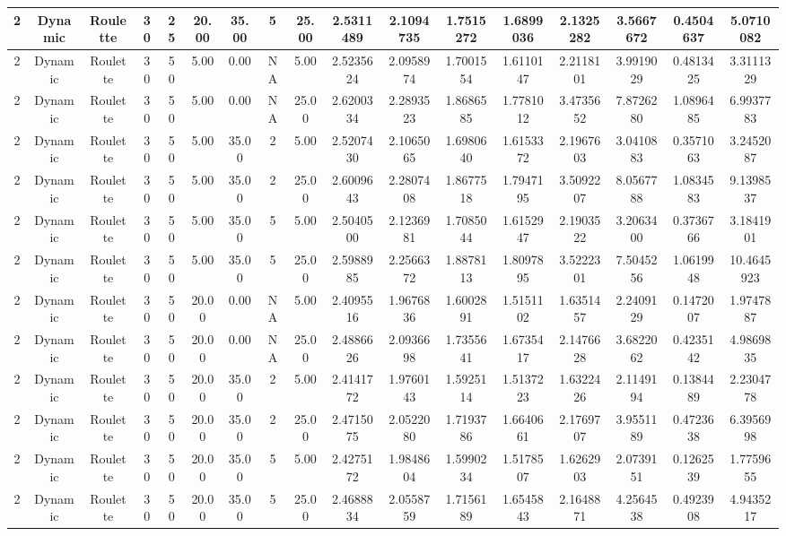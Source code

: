\documentclass[a4paper]{article}
\begin{document}
\begin{center}
\begin{tabular}{ | c | c | c | c | c | c | c | c | c | c | c | c | c | c | c | c | c | }
		\hline
		2	&	Dynamic	&	Roulette	&	30	&	25	&	20.00	&	35.00	&	5	&	25.00	&	2.5311489	&	2.1094735	&	1.7515272	&	1.6899036	&	2.1325282	&	3.5667672	&	0.4504637	&	5.0710082 \\
		\hline
		2	&	Dynamic	&	Roulette	&	30	&	50	&	5.00	&	0.00	&	NA	&	5.00	&	2.5235624	&	2.0958974	&	1.7001554	&	1.6110147	&	2.2118101	&	3.9919029	&	0.4813425	&	3.3111329 \\
		\hline
		2	&	Dynamic	&	Roulette	&	30	&	50	&	5.00	&	0.00	&	NA	&	25.00	&	2.6200334	&	2.2893523	&	1.8686585	&	1.7781012	&	3.4735652	&	7.8726280	&	1.0896485	&	6.9937783 \\
		\hline
		2	&	Dynamic	&	Roulette	&	30	&	50	&	5.00	&	35.00	&	2	&	5.00	&	2.5207430	&	2.1065065	&	1.6980640	&	1.6153372	&	2.1967603	&	3.0410883	&	0.3571063	&	3.2452087 \\
		\hline
		2	&	Dynamic	&	Roulette	&	30	&	50	&	5.00	&	35.00	&	2	&	25.00	&	2.6009643	&	2.2807408	&	1.8677518	&	1.7947195	&	3.5092207	&	8.0567788	&	1.0834583	&	9.1398537 \\
		\hline
		2	&	Dynamic	&	Roulette	&	30	&	50	&	5.00	&	35.00	&	5	&	5.00	&	2.5040500	&	2.1236981	&	1.7085044	&	1.6152947	&	2.1903522	&	3.2063400	&	0.3736766	&	3.1841901 \\
		\hline
		2	&	Dynamic	&	Roulette	&	30	&	50	&	5.00	&	35.00	&	5	&	25.00	&	2.5988985	&	2.2566372	&	1.8878113	&	1.8097895	&	3.5222301	&	7.5045256	&	1.0619948	&	10.4645923 \\
		\hline
		2	&	Dynamic	&	Roulette	&	30	&	50	&	20.00	&	0.00	&	NA	&	5.00	&	2.4095516	&	1.9676836	&	1.6002891	&	1.5151102	&	1.6351457	&	2.2409129	&	0.1472007	&	1.9747887 \\
		\hline
		2	&	Dynamic	&	Roulette	&	30	&	50	&	20.00	&	0.00	&	NA	&	25.00	&	2.4886626	&	2.0936698	&	1.7355641	&	1.6735417	&	2.1476628	&	3.6822062	&	0.4235142	&	4.9869835 \\
		\hline
		2	&	Dynamic	&	Roulette	&	30	&	50	&	20.00	&	35.00	&	2	&	5.00	&	2.4141772	&	1.9760143	&	1.5925114	&	1.5137223	&	1.6322426	&	2.1149194	&	0.1384489	&	2.2304778 \\
		\hline
		2	&	Dynamic	&	Roulette	&	30	&	50	&	20.00	&	35.00	&	2	&	25.00	&	2.4715075	&	2.0522080	&	1.7193786	&	1.6640661	&	2.1769707	&	3.9551189	&	0.4723638	&	6.3956998 \\
		\hline
		2	&	Dynamic	&	Roulette	&	30	&	50	&	20.00	&	35.00	&	5	&	5.00	&	2.4275172	&	1.9848604	&	1.5990234	&	1.5178507	&	1.6262903	&	2.0739151	&	0.1262539	&	1.7759655 \\
		\hline
		2	&	Dynamic	&	Roulette	&	30	&	50	&	20.00	&	35.00	&	5	&	25.00	&	2.4688834	&	2.0558759	&	1.7156189	&	1.6545843	&	2.1648871	&	4.2564538	&	0.4923908	&	4.9435217 \\

\end{tabular}
\end{center}
\end{document}
